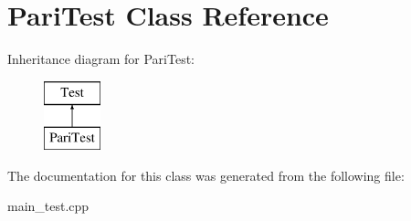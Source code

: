 \hypertarget{class_pari_test}{}\section{Pari\+Test Class Reference}
\label{class_pari_test}
Inheritance diagram for Pari\+Test\+:\begin{figure}[H]
\begin{center}
\leavevmode
\includegraphics[height=2.000000cm]{class_pari_test}
\end{center}
\end{figure}


The documentation for this class was generated from the following file\+:\begin{DoxyCompactItemize}
\item 
main\+\_\+test.\+cpp\end{DoxyCompactItemize}

